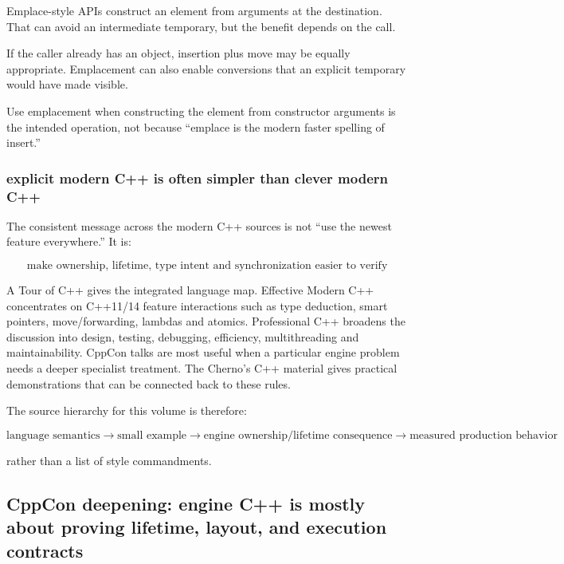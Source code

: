 Emplace-style APIs construct an element from arguments at the destination. That can avoid an intermediate temporary, but the benefit depends on the call.

If the caller already has an object, insertion plus move may be equally appropriate. Emplacement can also enable conversions that an explicit temporary would have made visible.

Use emplacement when constructing the element from constructor arguments is the intended operation, not because ``emplace is the modern faster spelling of insert.''

\subsubsection{explicit modern C++ is often simpler than clever modern C++}\label{01-foundations-i-ch005-explicit-modern-c-is-often-simpler-than-clever-modern-c}

The consistent message across the modern C++ sources is not ``use the newest feature everywhere.'' It is:

\[
\boxed{
\text{make ownership, lifetime, type intent and synchronization easier to verify}
}
\]

A Tour of C++ gives the integrated language map. Effective Modern C++ concentrates on C++11/14 feature interactions such as type deduction, smart pointers, move/forwarding, lambdas and atomics. Professional C++ broadens the discussion into design, testing, debugging, efficiency, multithreading and maintainability. CppCon talks are most useful when a particular engine problem needs a deeper specialist treatment. The Cherno's C++ material gives practical demonstrations that can be connected back to these rules.

The source hierarchy for this volume is therefore:

\[
\text{language semantics}
\rightarrow
\text{small example}
\rightarrow
\text{engine ownership/lifetime consequence}
\rightarrow
\text{measured production behavior}
\]

rather than a list of style commandments.

\subsection{CppCon deepening: engine C++ is mostly about proving lifetime, layout, and execution contracts}\label{01-foundations-i-ch005-cppcon-deepening-engine-c-is-mostly-about-proving-lifetime-layout-and-execution-contracts}


